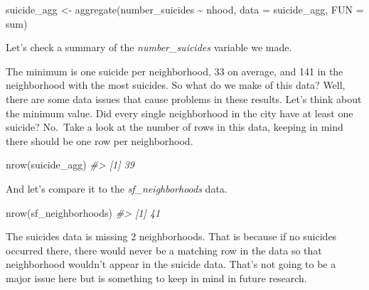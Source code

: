\documentclass[
]{krantz}
\makeatletter
\newenvironment{Shaded}{\begin{snugshade}}{\end{snugshade}}
\newcommand{\AttributeTok}[1]{\textcolor[rgb]{0.61,0.61,0.61}{#1}}
\newcommand{\CommentTok}[1]{\textcolor[rgb]{0.37,0.37,0.37}{\textit{#1}}}
\newcommand{\FunctionTok}[1]{\textcolor[rgb]{0,0,0}{#1}}
\newcommand{\NormalTok}[1]{#1}
\newcommand{\OtherTok}[1]{\textcolor[rgb]{0.37,0.37,0.37}{#1}}
\newcommand{\SpecialCharTok}[1]{\textcolor[rgb]{0,0,0}{#1}}
\newenvironment{kframe}{%
\medskip{}
\setlength{\fboxsep}{.8em}
 \def\at@end@of@kframe{}%
 \ifinner\ifhmode%
  \def\at@end@of@kframe{\end{minipage}}%
  \begin{minipage}{\columnwidth}%
 \fi\fi%
 \def\FrameCommand##1{\hskip\@totalleftmargin \hskip-\fboxsep
 \colorbox{shadecolor}{##1}\hskip-\fboxsep
     \hskip-\linewidth \hskip-\@totalleftmargin \hskip\columnwidth}%
 \MakeFramed {\advance\hsize-\width
   \@totalleftmargin\z@ \linewidth\hsize
   \@setminipage}}%
 {\par\unskip\endMakeFramed%
 \at@end@of@kframe}
\renewenvironment{Shaded}{\begin{kframe}}{\end{kframe}}
\makeatother
\begin{document}
\begin{Shaded}
\begin{Highlighting}[]
\NormalTok{suicide\_agg }\OtherTok{\textless{}{-}} \FunctionTok{aggregate}\NormalTok{(number\_suicides }\SpecialCharTok{\textasciitilde{}}\NormalTok{ nhood, }\AttributeTok{data =}\NormalTok{ suicide\_agg,}
  \AttributeTok{FUN =}\NormalTok{ sum)}
\end{Highlighting}
\end{Shaded}

Let's check a summary of the \emph{number\_suicides} variable we made.

\begin{Shaded}
\end{Shaded}

The minimum is one suicide per neighborhood, 33 on average, and 141 in the neighborhood with the most suicides. So what do we make of this data? Well, there are some data issues that cause problems in these results. Let's think about the minimum value. Did every single neighborhood in the city have at least one suicide? No.~Take a look at the number of rows in this data, keeping in mind there should be one row per neighborhood.

\begin{Shaded}
\begin{Highlighting}[]
\FunctionTok{nrow}\NormalTok{(suicide\_agg)}
\CommentTok{\#\textgreater{} [1] 39}
\end{Highlighting}
\end{Shaded}

And let's compare it to the \emph{sf\_neighborhoods} data.

\begin{Shaded}
\begin{Highlighting}[]
\FunctionTok{nrow}\NormalTok{(sf\_neighborhoods)}
\CommentTok{\#\textgreater{} [1] 41}
\end{Highlighting}
\end{Shaded}

The suicides data is missing 2 neighborhoods. That is because if no suicides occurred there, there would never be a matching row in the data so that neighborhood wouldn't appear in the suicide data. That's not going to be a major issue here but is something to keep in mind in future research.
\end{document}
